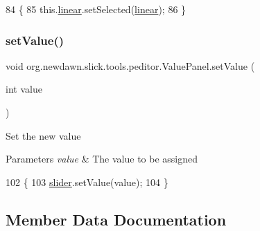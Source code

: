\begin{DoxyCode}
84                                           \{
85         this.\mbox{\hyperlink{classorg_1_1newdawn_1_1slick_1_1tools_1_1peditor_1_1_value_panel_accd8a5d5872a9fe38b1e546944982dfd}{linear}}.setSelected(\mbox{\hyperlink{classorg_1_1newdawn_1_1slick_1_1tools_1_1peditor_1_1_value_panel_accd8a5d5872a9fe38b1e546944982dfd}{linear}});
86     \}
\end{DoxyCode}
\mbox{\label{classorg_1_1newdawn_1_1slick_1_1tools_1_1peditor_1_1_value_panel_a8cfa3d3ef8c70a27962db60cfaa1e7fc}} 
\subsubsection{\texorpdfstring{set\+Value()}{setValue()}}
{\footnotesize\ttfamily void org.\+newdawn.\+slick.\+tools.\+peditor.\+Value\+Panel.\+set\+Value (\begin{DoxyParamCaption}\item[{int}]{value }\end{DoxyParamCaption})\hspace{0.3cm}{\ttfamily [inline]}}

Set the new value


\begin{DoxyParams}{Parameters}
{\em value} & The value to be assigned \\
\hline
\end{DoxyParams}

\begin{DoxyCode}
102                                     \{
103         \mbox{\hyperlink{classorg_1_1newdawn_1_1slick_1_1tools_1_1peditor_1_1_value_panel_a7b5cc531a99541b95b43875ab0e9766f}{slider}}.setValue(value);
104     \}
\end{DoxyCode}


\subsection{Member Data Documentation}
\mbox{\label{classorg_1_1newdawn_1_1slick_1_1tools_1_1peditor_1_1_value_panel_accd8a5d5872a9fe38b1e546944982dfd}} 
